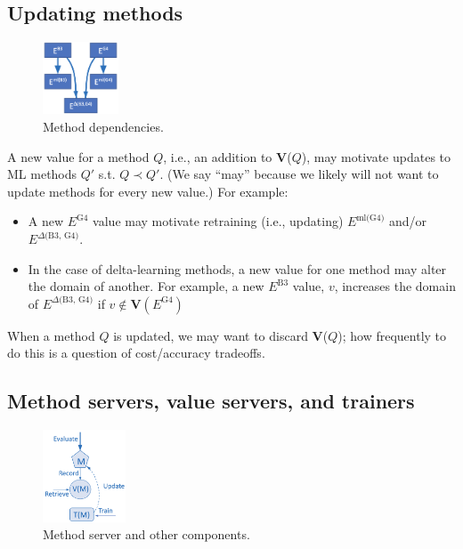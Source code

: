 \documentclass[10pt]{article}
\begin{document}
\subsection{Updating methods}

\begin{figure}
\vspace{-3ex}
  \centering
  \includegraphics[width=0.2\textwidth,trim=0in 0in 0in 0in,clip]{./Figs/deps.png}
  \vspace{-4ex}
  \caption{Method dependencies.
\label{fig:deps}}
\end{figure}

A new value for a method $Q$, i.e., an addition to \textbf{V}($Q$), may motivate updates to ML methods $Q'$ s.t. $Q \prec Q'$. 
(We say ``may'' because we likely will not want to update methods for every new value.)
For example:
\begin{itemize}\itemsep-0.2em 
\item
A new $E^{\textrm{G4}}$ value may motivate retraining (i.e., updating) $E^{\textrm{ml(G4)}}$ and/or $E^{\textrm{$\Delta$(B3, G4)}}$.
\item
In the case of delta-learning methods, a new value for one method may alter the domain of another.
For example, a new $E^{\textrm{B3}}$  value, $v$, increases the domain of $E^{\textrm{$\Delta$(B3, G4)}}$ if $v \notin \textbf{V}(E^{\textrm{G4}})$
\end{itemize}

When a method $Q$ is updated, we may want to discard \textbf{V}($Q$);
how frequently to do this is a question of cost/accuracy tradeoffs.

\subsection{Method servers, value servers, and trainers}

\begin{figure}
\vspace{-2ex}
  \centering
  \includegraphics[width=0.22\textwidth,trim=0in 0in 0in 0in,clip]{./Figs/servers.png}
  \vspace{-4ex}
  \caption{Method server and other components.
\label{fig:server}}
\end{figure}
\end{document}
